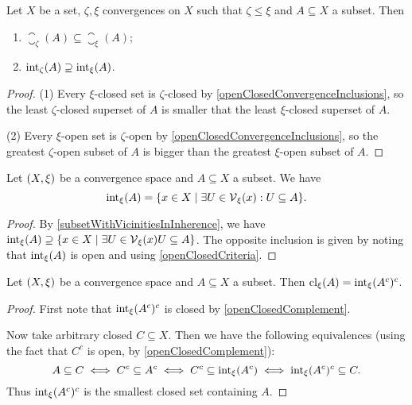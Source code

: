 \begin{lemma} \label{interiorClosureMonotoneInConvergence}
Let $X$ be a set, $\zeta, \xi$ convergences on $X$ such that $\zeta\leq \xi$ and $A\subseteq X$ a subset. Then
\begin{enumerate}
\item $\closure_\zeta(A) \subseteq \closure_
\xi(A)$;
\item $\operatorname{int}_\zeta(A) \supseteq \operatorname{int}_
\xi(A)$.
\end{enumerate}
\end{lemma}
\begin{proof}
(1) Every $\xi$-closed set is $\zeta$-closed by \ref{openClosedConvergenceInclusions}, so the least $\zeta$-closed superset of $A$ is smaller that the least $\xi$-closed superset of $A$.

(2) Every $\xi$-open set is $\zeta$-open by \ref{openClosedConvergenceInclusions}, so the greatest $\zeta$-open subset of $A$ is bigger than the greatest $\xi$-open subset of $A$.
\end{proof}

\begin{proposition}
Let $\sSet{X,\xi}$ be a convergence space and $A\subseteq X$ a subset. We have
\[ \interior_\xi(A) = \setbuilder{x\in X}{\exists U\in \vicinity_\xi(x): U\subseteq A}. \]
\end{proposition}
\begin{proof}
By \ref{subsetWithVicinitiesInInherence}, we have $\interior_\xi(A) \supseteq \setbuilder{x\in X}{\exists U\in \vicinity_\xi(x) U\subseteq A}$. The opposite inclusion is given by noting that $\operatorname{int}_\xi(A)$ is open and using \ref{openClosedCriteria}.
\end{proof}

\begin{lemma} \label{interiorClosureComplement}
Let $\sSet{X,\xi}$ be a convergence space and $A\subseteq X$ a subset. Then $\operatorname{cl}_\xi(A) = \operatorname{int}_\xi(A^c)^c$.
\end{lemma}
\begin{proof}
First note that $\operatorname{int}_\xi(A^c)^c$ is closed by \ref{openClosedComplement}.

Now take arbitrary closed $C\subseteq X$. Then we have the following equivalences (using the fact that $C^c$ is open, by \ref{openClosedComplement}):
\[ A\subseteq C \iff C^c \subseteq A^c \iff C^c \subseteq \operatorname{int}_\xi(A^c) \iff \operatorname{int}_\xi(A^c)^c\subseteq C. \]
Thus $\operatorname{int}_\xi(A^c)^c$ is the smallest closed set containing $A$.
\end{proof}

